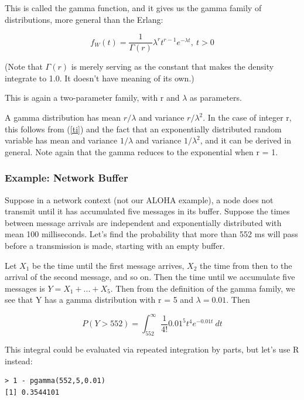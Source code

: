 This is called the gamma function, and it gives us the gamma family of
distributions, more general than the Erlang:

\begin{equation}
f_W(t) = \frac{1}{\Gamma(r)} \lambda^r t^{r-1} e^{-\lambda t}, ~ t > 0
\end{equation}

(Note that $\Gamma(r)$ is merely serving as the constant that makes the
density integrate to 1.0.  It doesn't have meaning of its own.)

This is again a two-parameter family, with r and $\lambda$ as
parameters.

A gamma distribution has mean $r/\lambda$ and variance $r/\lambda^2$.
In the case of integer r, this follows from (\ref{ti}) and the fact that
an exponentially distributed random variable has mean and variance
$1/\lambda$ and variance $1/\lambda^2$, and it can be derived in
general.  Note again that the gamma reduces to the exponential when r =
1.  

\subsubsection{Example:  Network Buffer}
\label{netbuff}

Suppose in a network context (not our ALOHA example), a node does not
transmit until it has accumulated five messages in its buffer. Suppose
the times between message arrivals are independent and  exponentially
distributed with mean 100 milliseconds.  Let's find the probability that
more than 552 ms will pass before a transmission is made, starting with
an empty buffer. 

Let $X_1$ be the time until the first message arrives, $X_2$ the time
from then to the arrival of the second message, and so on.  Then the
time until we accumulate five messages is $Y = X_1+...+X_5$.  Then from
the definition of the gamma family, we see that Y has a gamma
distribution with r = 5 and $\lambda = 0.01$.  Then

\begin{equation}
P(Y > 552) = 
\int_{552}^{\infty}
\frac{1}{4!} 0.01^5 t^4 e^{-0.01t} ~ dt
\end{equation}

This integral could be evaluated via repeated integration by parts, but
let's use R instead:

\begin{Verbatim}[fontsize=\relsize{-2}]
> 1 - pgamma(552,5,0.01)
[1] 0.3544101
\end{Verbatim}

